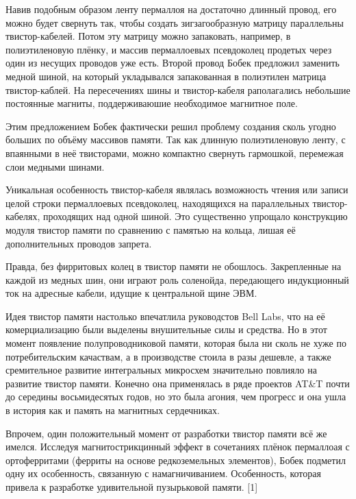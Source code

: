 Навив подобным образом ленту пермаллоя на достаточно длинный провод, его 
можно будет свернуть так, чтобы создать зигзагообразную 
матрицу параллельны твистор-кабелей. Потом эту матрицу можно запаковать, 
например, в полиэтиленовую плёнку, и массив пермаллоевых псевдоколец 
продетых через один из несущих проводов уже есть. Второй провод Бобек 
предложил заменить медной шиной, на который укладывался запакованная в 
полиэтилен матрица твистор-каблей. На пересечениях шины и твистор-кабеля 
раполагались небольшие постоянные магниты, поддерживаюшие необходимое 
магнитное поле. 

Этим предложением Бобек фактически решил проблему создания сколь угодно 
больших по объёму массивов памяти. Так как длинную полиэтиленовую ленту, с 
впаянными в неё твисторами, можно компактно свернуть гармошкой, перемежая 
слои медными шинами. 

Уникальная особенность твистор-кабеля являлась возможность 
чтения или записи целой строки пермаллоевых псевдоколец, находящихся на 
параллельных твистор-кабелях, проходящих над одной шиной. Это существенно 
упрощало конструкцию модуля твистор памяти по сравнению с памятью на 
кольца, лишая её дополнительных проводов запрета. 

Правда, без фирритовых колец в твистор памяти не обошлось. Закрепленные 
на каждой из медных шин, они играют роль соленойда, передающего 
индукционный ток на адресные кабели, идущие к центральной щине ЭВМ.

Идея твистор памяти настолько впечатлила руководстов Bell Labs, что на 
её комерциализацию были выделены внушительные силы и средства. Но в этот 
момент появление полупроводниковой памяти, которая была ни сколь не хуже 
по потребительским качаствам, а в производстве стоила в разы дешевле, а 
также сремительное развитие интегральных микросхем значительно повлияло на 
развитие твистор памяти. Конечно она применялась в ряде проектов AT\&T 
почти до середины восьмидесятых годов, но это была агония, чем прогресс и 
она ушла в история как и память на магнитных сердечниках.

Впрочем, один положительный момент от разработки твистор памяти всё же 
имелся. Исследуя магнитострикцинный эффект в сочетаниях плёнок 
пермаллоая с ортоферритами (ферриты на основе редкоземельных элементов), 
Бобек подметил одну их особенность, связанную с намагничиванием. 
Особенность, которая привела к разработке удивительной пузырьковой 
памяти. [1]

